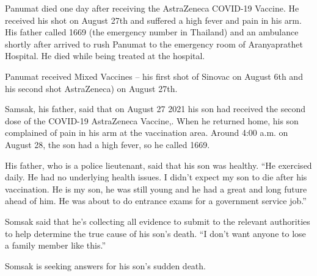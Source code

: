 Panumat died one day after receiving the AstraZeneca COVID-19 Vaccine. He
received his shot on August 27th and suffered a high fever and pain in his
arm. His father called 1669 (the emergency number in Thailand) and an ambulance
shortly after arrived to rush Panumat to the emergency room of Aranyaprathet
Hospital. He died while being treated at the hospital.

Panumat received Mixed Vaccines – his first shot of Sinovac on August 6th and
his second shot AstraZeneca) on August 27th.

Samsak, his father, said that on August 27 2021 his son had received the second
dose of the COVID-19 AstraZeneca Vaccine,. When he returned home, his son
complained of pain in his arm at the vaccination area. Around 4:00 a.m. on
August 28, the son had a high fever, so he called 1669.

His father, who is a police lieutenant, said that his son was healthy. “He
exercised daily. He had no underlying health issues. I didn’t expect my son to
die after his vaccination. He is my son, he was still young and he had a great
and long future ahead of him. He was about to do entrance exams for a government
service job.”

Somsak said that he’s collecting all evidence to submit to the relevant
authorities to help determine the true cause of his son’s death. “I don’t want
anyone to lose a family member like this.”

Somsak is seeking answers for his son’s sudden death.

